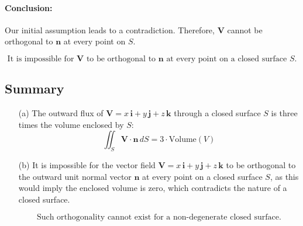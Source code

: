 \documentclass[11pt]{article}
\begin{document}
\paragraph{Conclusion:}
Our initial assumption leads to a contradiction. Therefore, \( \mathbf{V} \) cannot be orthogonal to \( \mathbf{n} \) at every point on \( S \).

\[
\boxed{ \text{It is impossible for } \mathbf{V} \text{ to be orthogonal to } \mathbf{n} \text{ at every point on a closed surface } S. }
\]

\newpage

\subsection{Summary}

\begin{enumerate}
    \item[(a)] The outward flux of \( \mathbf{V} = x\,\mathbf{i} + y\,\mathbf{j} + z\,\mathbf{k} \) through a closed surface \( S \) is three times the volume enclosed by \( S \):
    \[
    \boxed{ \iint_{S} \mathbf{V} \cdot \mathbf{n} \, dS = 3 \cdot \text{Volume}(V) }
    \]

    \item[(b)] It is impossible for the vector field \( \mathbf{V} = x\,\mathbf{i} + y\,\mathbf{j} + z\,\mathbf{k} \) to be orthogonal to the outward unit normal vector \( \mathbf{n} \) at every point on a closed surface \( S \), as this would imply the enclosed volume is zero, which contradicts the nature of a closed surface.

    \[
    \boxed{ \text{Such orthogonality cannot exist for a non-degenerate closed surface.} }
    \]
\end{enumerate}
\end{document}
